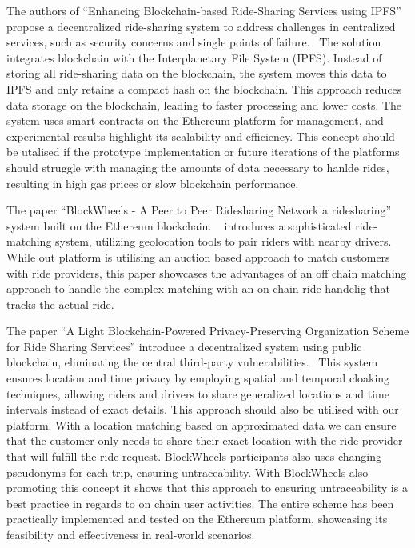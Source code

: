 The authors of ``Enhancing Blockchain-based Ride-Sharing Services using IPFS''  propose a decentralized ride-sharing system to address challenges in centralized services, such as security concerns and single points of failure.~\cite{Mahmoud.2022}  The solution integrates blockchain with the Interplanetary File System (IPFS). Instead of storing all ride-sharing data on the blockchain, the system moves this data to IPFS and only retains a compact hash on the blockchain. This approach reduces data storage on the blockchain, leading to faster processing and lower costs. The system uses smart contracts on the Ethereum platform for management, and experimental results highlight its scalability and efficiency. This concept should be utalised if the prototype implementation or future iterations of the platforms should struggle with managing the amounts of data necessary to hanlde rides, resulting in high gas prices or slow blockchain performance.


The paper ``BlockWheels - A Peer to Peer Ridesharing Network a ridesharing'' system built on the Ethereum blockchain. ~\cite{Joseph.} introduces a sophisticated ride-matching system, utilizing geolocation tools to pair riders with nearby drivers. While out platform is utilising an auction based approach to match customers with ride providers, this paper showcases the advantages of an off chain matching approach to handle the complex matching with an on chain ride handelig that tracks the actual ride.

The paper ``A Light Blockchain-Powered Privacy-Preserving Organization Scheme for Ride Sharing Services'' introduce a decentralized system using public blockchain, eliminating the central third-party vulnerabilities.~\cite{Baza.52520205282020} This system ensures location and time privacy by employing spatial and temporal cloaking techniques, allowing riders and drivers to share generalized locations and time intervals instead of exact details. This approach should also be utilised with our platform. With a location matching based on approximated data we can ensure that the customer only needs to share their exact location with the ride provider that will fulfill the ride request.
BlockWheels participants also uses changing pseudonyms for each trip, ensuring untraceability. With BlockWheels also promoting this concept it shows that this approach to ensuring untraceability is a best practice in regards to on chain user activities. The entire scheme has been practically implemented and tested on the Ethereum platform, showcasing its feasibility and effectiveness in real-world scenarios.

